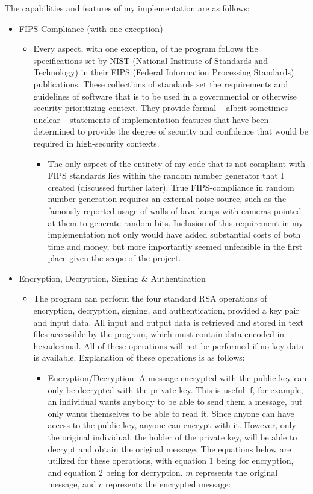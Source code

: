\documentclass[11pt]{article}
\begin{document}
The capabilities and features of my implementation are as follows:
\begin{itemize}
\item
{FIPS Compliance (with one exception)
	\begin{itemize}
	\item
	{Every aspect, with one exception, of the program follows the specifications set by NIST (National Institute of Standards and Technology) in their FIPS (Federal Information Processing Standards) publications. These collections of standards set the requirements and guidelines of software that is to be used in a governmental or otherwise security-prioritizing context. They provide formal -- albeit sometimes unclear -- statements of implementation features that have been determined to provide the degree of security and confidence that would be required in high-security contexts.
		\begin{itemize}
		\item
		{The only aspect of the entirety of my code that is not compliant with FIPS standards lies within the random number generator that I created (discussed further later). True FIPS-compliance in random number generation requires an external noise source, such as the famously reported usage of walls of lava lamps with cameras pointed at them to generate random bits. Inclusion of this requirement in my implementation not only would have added substantial costs of both time and money, but more importantly seemed unfeasible in the first place given the scope of the project.
		}
		\end{itemize}
	}
	\end{itemize}
}
\item
{Encryption, Decryption, Signing \& Authentication
	\begin{itemize}
	\item
	{The program can perform the four standard RSA operations of encryption, decryption, signing, and authentication, provided a key pair and input data. All input and output data is retrieved and stored in text files accessible by the program, which must contain data encoded in hexadecimal. All of these operations will not be performed if no key data is available. Explanation of these operations is as follows:
		\begin{itemize}
		\item
		{
		Encryption/Decryption: A message encrypted with the public key can only be decrypted with the private key. This is useful if, for example, an individual wants anybody to be able to send them a message, but only wants themselves to be able to read it. Since anyone can have access to the public key, anyone can encrypt with it. However, only the original individual, the holder of the private key, will be able to decrypt and obtain the original message. The equations below are utilized for these operations, with equation 1 being for encryption, and equation 2 being for decryption. $m$ represents the original message, and $c$ represents the encrypted message:\newline

}
\end{itemize}}
\end{itemize}}
\end{itemize}
\end{document}

